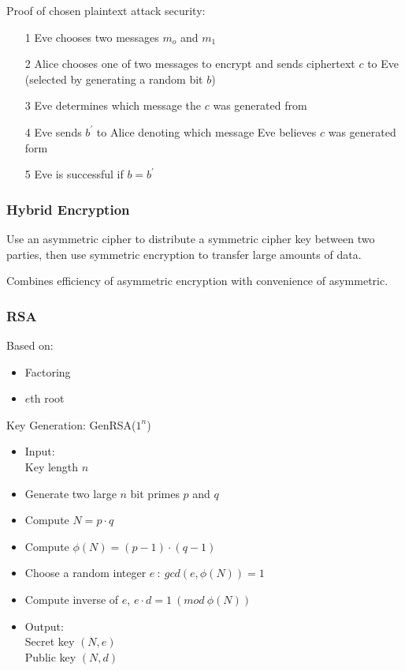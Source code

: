 \documentclass[a4paper]{article}
\begin{document}
Proof of chosen plaintext attack security:
\begin{enumerate}
  \item[1] Eve chooses two messages $m_{o}$ and $m_{1}$
  \item[2] Alice chooses one of two messages to encrypt and sends ciphertext $c$
           to Eve (selected by generating a random bit $b$)
  \item[3] Eve determines which message the $c$ was generated from
  \item[4] Eve sends $b^{\prime}$ to Alice denoting which message Eve believes
           $c$ was generated form
  \item[5] Eve is successful if $b = b^{\prime}$
\end{enumerate}

\subsubsection{Hybrid Encryption}

Use an asymmetric cipher to distribute a symmetric cipher key between two
parties, then use symmetric encryption to transfer large amounts of data.

Combines efficiency of asymmetric encryption with convenience of asymmetric.

\subsubsection{RSA}

Based on:
\begin{itemize}
  \item Factoring
  \item $e$th root
\end{itemize}

Key Generation: GenRSA($1^{n}$)
\begin{itemize}
  \item
    Input: \\
    Key length $n$
  \item Generate two large $n$ bit primes $p$ and $q$
  \item Compute $N = p \cdot q$
  \item Compute $\phi(N) = (p - 1) \cdot (q - 1)$
  \item Choose a random integer $e \: : \: gcd(e, \phi(N)) = 1$
  \item Compute inverse of $e$, $e \cdot d = 1 \: (mod \: \phi(N))$
  \item
    Output: \\
    Secret key $(N, e)$ \\
    Public key $(N, d)$
\end{itemize}
\end{document}

